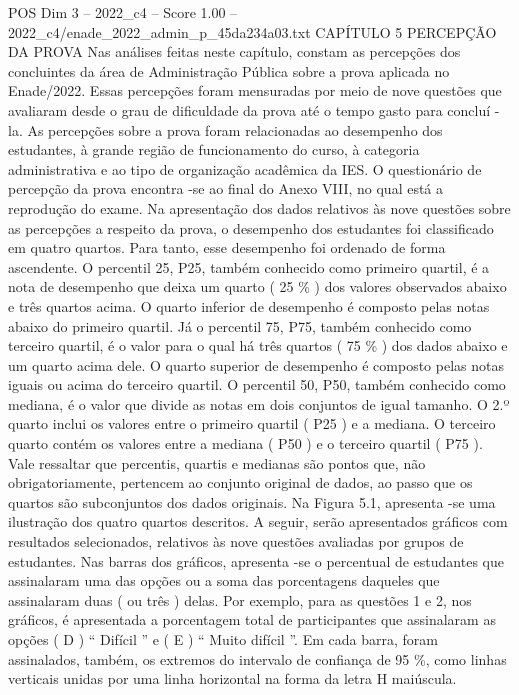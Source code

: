 \begin{textsample}{POS Dim 3 – 2022\_c4 – Score 1.00 – 2022\_c4/enade\_2022\_admin\_p\_45da234a03.txt}  \label{ex:f3_pos_179}
CAPÍTULO 5 PERCEPÇÃO DA PROVA Nas análises feitas neste capítulo, constam as percepções dos concluintes da área de Administração Pública sobre a prova aplicada no Enade/2022.
Essas percepções foram mensuradas por meio de nove questões que avaliaram desde o grau de dificuldade da prova até o tempo gasto para concluí -la.
As percepções sobre a prova foram relacionadas ao desempenho dos estudantes, à grande região de funcionamento do curso, à categoria administrativa e ao tipo de organização acadêmica da IES.
O questionário de percepção da prova encontra -se ao final do Anexo VIII, no qual está a reprodução do exame.
Na apresentação dos dados relativos às nove questões sobre as percepções a respeito da prova, o desempenho dos estudantes foi classificado em quatro quartos.
Para tanto, esse desempenho foi ordenado de forma ascendente.
O percentil 25, P25, também conhecido como primeiro quartil, é a nota de desempenho que deixa um quarto ( 25 \% ) dos valores observados abaixo e três quartos acima.
O quarto inferior de desempenho é composto pelas notas abaixo do primeiro quartil.
Já o percentil 75, P75, também conhecido como terceiro quartil, é o valor para o qual há três quartos ( 75 \% ) dos dados abaixo e um quarto acima dele.
O quarto superior de desempenho é composto pelas notas iguais ou acima do terceiro quartil.
O percentil 50, P50, também conhecido como mediana, é o valor que divide as notas em dois conjuntos de igual tamanho.
O 2.º quarto inclui os valores entre o primeiro quartil ( P25 ) e a mediana.
O terceiro quarto contém os valores entre a mediana ( P50 ) e o terceiro quartil ( P75 ).
Vale ressaltar que percentis, quartis e medianas são pontos que, não obrigatoriamente, pertencem ao conjunto original de dados, ao passo que os quartos são subconjuntos dos dados originais.
Na Figura 5.1, apresenta -se uma ilustração dos quatro quartos descritos.
A seguir, serão apresentados gráficos com resultados selecionados, relativos às nove questões avaliadas por grupos de estudantes.
Nas barras dos gráficos, apresenta -se o percentual de estudantes que assinalaram uma das opções ou a soma das porcentagens daqueles que assinalaram duas ( ou três ) delas.
Por exemplo, para as questões 1 e 2, nos gráficos, é apresentada a porcentagem total de participantes que assinalaram as opções ( D ) “ Difícil ” e ( E ) “ Muito difícil ”.
Em cada barra, foram assinalados, também, os extremos do intervalo de confiança de 95 \%, como linhas verticais unidas por uma linha horizontal na forma da letra H maiúscula.

\end{textsample}
